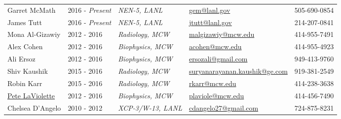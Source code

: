 \begin{center}
\begin{minipage}{\textwidth}
\begin{tabular}{p{3.2cm}p{2.2cm}p{3.7cm}p{5.0cm}p{2.4cm}}

Garret McMath & 2016 - \emph{Present} & \textit{NEN-5, LANL} & \href{mailto:gem@lanl.gov}{gem@lanl.gov}     & 505-690-0854 \\
James Tutt    & 2016 - \emph{Present} & \textit{NEN-5, LANL} & \href{mailto:jtutt@lanl.gov}{jtutt@lanl.gov} & 214-207-0841 \\
Mona Al-Gizawiy & 2012 - 2016         & \textit{Radiology, MCW} &  \href{mailto:malgizawiy@mcw.edu}{malgizawiy@mcw.edu} & 414-955-7491 \\
Alex Cohen & 2012 - 2016 & \textit{Biophysics, MCW} &  \href{mailto:acohen@mcw.edu}{acohen@mcw.edu} & 414-955-4923 \\
Ali Ersoz & 2012 - 2016 & \textit{Biophysics, MCW} &  \href{mailto:ersozali@gmail.com}{ersozali@gmail.com} & 949-413-9760 \\
Shiv Kaushik & 2015 - 2016 & \textit{Radiology, MCW} &  \href{mailto:suryanarayanan.kaushik@ge.com}{suryanarayanan.kaushik@ge.com} & 919-381-2549 \\ %
Robin Karr   & 2015 - 2016 & \textit{Radiology, MCW} &  \href{mailto:rkarr@mcw.edu}{rkarr@mcw.edu} & 414-238-3638 \\ %

\href{http://www.mcw.edu/radiology/faculty/PeterLaViolette.htm}{Pete LaViolette} & 2012 - 2016 & \textit{Biophysics, MCW} &  \href{mailto:plaviole@mcw.edu}{plaviole@mcw.edu} & 414-456-7490 \\ %

Chelsea D'Angelo\label{chelsea_dangelo} & {2010 - 2012} & \textit{XCP-3/W-13, LANL}& \href{mailto:cdangelo27@gmail.com}{cdangelo27@gmail.com} & 724-875-8231\\ %


\end{tabular}
\end{minipage}
\end{center}

